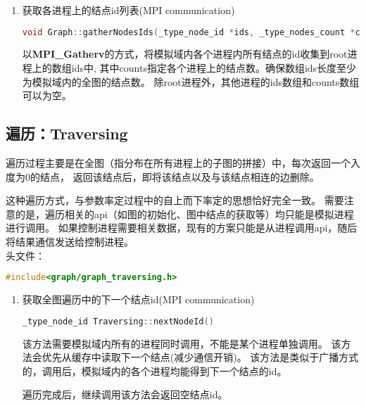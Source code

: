 \begin{enumerate}
 \item 获取各进程上的结点id列表(MPI communication)
\begin{lstlisting}[language=c++]
  void Graph::gatherNodesIds(_type_node_id *ids, _type_nodes_count *counts, kiwi::RID root)
\end{lstlisting}
  以\textbf{MPI\_Gatherv}的方式，将模拟域内各个进程内所有结点的id收集到root进程上的数组ids中,
  其中counts指定各个进程上的结点数。确保数组ids长度至少为模拟域内的全图的结点数。
  除root进程外，其他进程的ids数组和counts数组可以为空。

\end{enumerate}

\subsection{遍历：Traversing}
遍历过程主要是在全图（指分布在所有进程上的子图的拼接）中，每次返回一个入度为$0$的结点，
返回该结点后，即将该结点以及与该结点相连的边删除。

这种遍历方式，与参数率定过程中的自上而下率定的思想恰好完全一致。
需要注意的是，遍历相关的api（如图的初始化、图中结点的获取等）均只能是模拟进程进行调用。
如果控制进程需要相关数据，现有的方案只能是从进程调用api，随后将结果通信发送给控制进程。
\\头文件：
\begin{lstlisting}[language=c]
#include<graph/graph_traversing.h>
\end{lstlisting}

\begin{enumerate}
  \item 获取全图遍历中的下一个结点id(MPI communication)
\begin{lstlisting}[language=c++]
  _type_node_id Traversing::nextNodeId()
\end{lstlisting}
该方法需要模拟域内所有的进程同时调用，不能是某个进程单独调用。
该方法会优先从缓存中读取下一个结点(减少通信开销)。
该方法是类似于广播方式的，调用后，模拟域内的各个进程均能得到下一个结点的id。

遍历完成后，继续调用该方法会返回空结点id。

\end{enumerate}